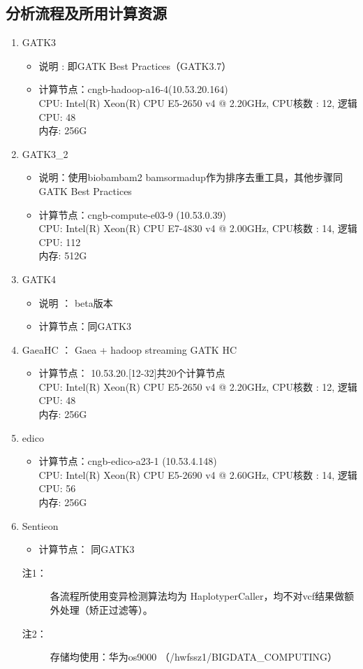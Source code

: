\documentclass[UTF8,10pt,a4paper]{ctexart}
\begin{document}
\subsection{分析流程及所用计算资源}
\begin{enumerate}

\item GATK3
	\begin{itemize}
	\item 说明 : 即GATK Best Practices（GATK3.7）
	\item 计算节点：cngb-hadoop-a16-4(10.53.20.164)\\
	 CPU: Intel(R) Xeon(R) CPU E5-2650 v4 @ 2.20GHz, CPU核数 : 12,  逻辑CPU: 48\\
	 内存: 256G
	\end{itemize}
\item GATK3\_2 
	\begin{itemize}
	\item 说明：使用biobambam2 bamsormadup作为排序去重工具，其他步骤同GATK Best Practices
	\item 计算节点：cngb-compute-e03-9 (10.53.0.39)\\
	 CPU: Intel(R) Xeon(R) CPU E7-4830 v4 @ 2.00GHz, CPU核数 : 14,  逻辑CPU: 112\\
	 内存: 512G
	\end{itemize}
\item GATK4
	\begin{itemize}
	\item 说明 ： beta版本
	 \item 计算节点：同GATK3
	\end{itemize}
\item GaeaHC ： Gaea + hadoop streaming GATK HC
	\begin{itemize}
	\item 计算节点： 10.53.20.[12-32]共20个计算节点\\
	 CPU: Intel(R) Xeon(R) CPU E5-2650 v4 @ 2.20GHz, CPU核数 : 12,  逻辑CPU: 48\\
	 内存: 256G
	\end{itemize}
\item edico
      \begin{itemize}
      \item 计算节点：cngb-edico-a23-1 (10.53.4.148)\\
         CPU: Intel(R) Xeon(R) CPU E5-2690 v4 @ 2.60GHz, CPU核数 : 14,  逻辑CPU: 56\\
	 内存: 256G
	\end{itemize}
\item Sentieon
\begin{itemize}
\item 计算节点： 同GATK3
\end{itemize}
\begin{description}
\item[注1：]  各流程所使用变异检测算法均为 HaplotyperCaller，均不对vcf结果做额外处理（矫正过滤等）。
\item[注2：]  存储均使用：华为os9000 （/hwfssz1/BIGDATA\_COMPUTING）
\end{description}
\end{enumerate}
\end{document}
